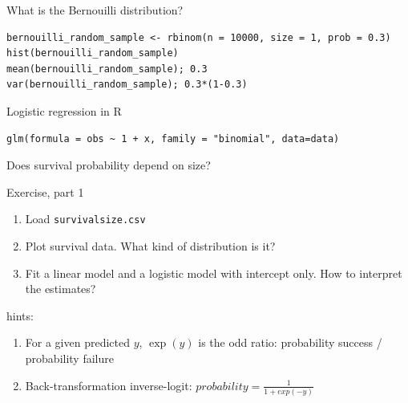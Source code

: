 \documentclass{beamer}
\makeatletter
\newenvironment{kframe}{%
 \def\at@end@of@kframe{}%
 \ifinner\ifhmode%
  \def\at@end@of@kframe{\end{minipage}}%
  \begin{minipage}{\columnwidth}%
 \fi\fi%
 \def\FrameCommand##1{\hskip\@totalleftmargin \hskip-\fboxsep
 \colorbox{shadecolor}{##1}\hskip-\fboxsep
     \hskip-\linewidth \hskip-\@totalleftmargin \hskip\columnwidth}%
 \MakeFramed {\advance\hsize-\width
   \@totalleftmargin\z@ \linewidth\hsize
   \@setminipage}}%
 {\par\unskip\endMakeFramed%
 \at@end@of@kframe}
\newenvironment{knitrout}{}{} %
\makeatother
\begin{document}
\begin{frame}[fragile]{What is the Bernouilli distribution?}

    
\begin{knitrout}
\color{fgcolor}\begin{kframe}
\begin{verbatim}
bernouilli_random_sample <- rbinom(n = 10000, size = 1, prob = 0.3)
hist(bernouilli_random_sample)
mean(bernouilli_random_sample); 0.3
var(bernouilli_random_sample); 0.3*(1-0.3)
\end{verbatim}
\end{kframe}
\end{knitrout}

\end{frame}

  
\begin{frame}[fragile]{Logistic regression in R}

    
\begin{knitrout}
\color{fgcolor}\begin{kframe}
\begin{verbatim}
glm(formula = obs ~ 1 + x, family = "binomial", data=data)
\end{verbatim}
\end{kframe}
\end{knitrout}

\end{frame}

\begin{frame}{Does survival probability depend on size?}
 
  \begin{exampleblock}{Exercise, part 1}
    \begin{enumerate}
      \item Load \texttt{survivalsize.csv}
      \item Plot survival data. What kind of distribution is it?
      \item Fit a linear model and a logistic model with intercept only. How to interpret the estimates?
    \end{enumerate}
  \end{exampleblock}
  
  \pause
  
  \begin{block}{hints:}
  \begin{enumerate}
   \item For a given predicted $y$, $\exp(y)$ is the odd ratio: probability success / probability failure
   \item Back-transformation inverse-logit: $probability = \frac{1}{1 + exp(-y)}$
  \end{enumerate}
  \end{block}

  
\end{frame}
\end{document}
